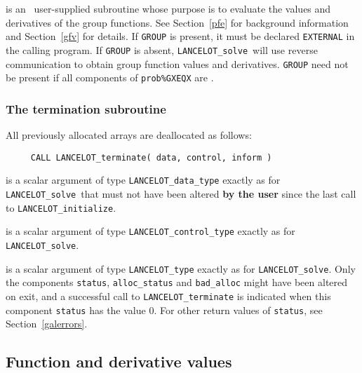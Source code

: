 \documentclass{galahad}
\newcommand{\fullpackagename}{LANC\-E\-LOT}
\newcommand{\solver}{{\tt \fullpackagename\_solve}}
\begin{document}
\begin{description}
 is an \optional\
user-supplied subroutine whose purpose is to
evaluate the values and derivatives of the group functions.
See Section~\ref{pfe} for background information and Section~\ref{gfv}
for details.
If {\tt GROUP} is present,
it must be declared {\tt EXTERNAL} in the calling program.
If {\tt GROUP} is absent, \solver\ will use reverse communication to
obtain group function values and derivatives. {\tt GROUP} need not be
present if all components of {\tt prob\%GXEQX} are \true.

\end{description}


\subsubsection{The  termination subroutine}
All previously allocated arrays are deallocated as follows:
\hskip0.5in
\def\baselinestretch{0.8} {\tt \begin{verbatim}
     CALL LANCELOT_terminate( data, control, inform )
\end{verbatim}}
\def\baselinestretch{1.0}

\begin{description}
 is a scalar \intentinout argument of type
{\tt \fullpackagename\_data\_type}
exactly as for
\solver\
that must not have been altered {\bf by the user} since the last call to
{\tt \fullpackagename\_initialize}.

 is a scalar \intentin argument of type
{\tt \fullpackagename\_control\_type}
exactly as for
\solver.

 is a scalar \intentinout argument of type
{\tt \fullpackagename\_type}
exactly as for
\solver.
Only the components {\tt status}, {\tt alloc\_status} and
{\tt bad\_alloc} might have been altered on exit, and a
successful call to
{\tt \fullpackagename\_terminate}
is indicated when this  component {\tt status} has the value 0.
For other return values of {\tt status}, see Section~\ref{galerrors}.

\end{description}


\subsection{Function and derivative values\label{fdv}}
\end{document}
